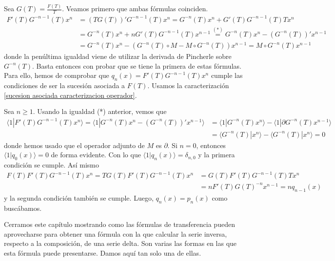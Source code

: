 \begin{demo}
    Sea $G(T) = \frac{F(T)}{T}$. Veamos primero que ambas fórmulas coinciden.
    \begin{align*}
        F'(T)G^{-n-1}(T)x^n & = (TG(T))'G^{-n-1}(T)x^n = G^{-n}(T)x^n + G'(T)G^{-n-1}(T)Tx^n\\
        & = G^{-n}(T)x^n + nG'(T)G^{-n-1}(T)x^{n-1} \stackrel{(*)}{=} G^{-n}(T)x^n - (G^{-n}(T))'x^{n-1}\\
        & = G^{-n}(T)x^n - (G^{-n}(T) \circ M - M \circ G^{-n}(T)) x^{n-1} = M \circ G^{-n}(T) x^{n-1}
    \end{align*}
    donde la penúltima igualdad viene de utilizar la derivada de Pincherle sobre $G^{-n}(T)$. Basta entonces con probar que se tiene la primera de estas fórmulas. Para ello, hemos de comprobar que $q_n(x) = F'(T)G^{-n-1} (T)x^n $ cumple las condiciones de ser la sucesión asociada a $F(T)$. Usamos la caracterización \ref{sucesion asociada caracterizacion operador}.

    Sea $n \geq 1$. Usando la igualdad (*) anterior, vemos que
    \begin{align*}
        \langle 1| F'(T)G^{-n-1} (T)x^n \rangle = \langle 1 | G^{-n}(T) x^n - (G^{-n}(T))'x^{n-1} \rangle & = \langle 1 | G^{-n}(T) x^n \rangle - \langle 1 | \partial G^{-n}(T)x^{n-1} \rangle \\
        & = \langle G^{-n}(T) | x^n \rangle - \langle G^{-n}(T) | x^{n} \rangle = 0
    \end{align*}
    donde hemos usado que el operador adjunto de $M$ es $\partial$. Si $n = 0$, entonces $\langle 1| q_0(x) \rangle = 0$ de forma evidente. Con lo que $\langle 1| q_n(x) \rangle = \delta_{n,0} $ y la primera condición se cumple. Así mismo
    \begin{align*}
        F(T)F'(T)G^{-n-1} (T)x^n = TG(T)F'(T)G^{-n-1} (T)x^n & = G(T)F'(T)G^{-n-1} (T) T x^n \\
        & = nF'(T)G(T)^{-n}x^{n-1} = nq_{n-1}(x)
    \end{align*} 
    y la segunda condición también se cumple. Luego, $q_n(x) = p_n(x)$ como buscábamos.
\end{demo}

Cerramos este capítulo mostrando como las fórmulas de transferencia pueden aprovecharse para obtener una fórmula con la que calcular la serie inversa, respecto a la composición, de una serie delta. Son varias las formas en las que esta fórmula puede presentarse. Damos aquí tan solo una de ellas.

